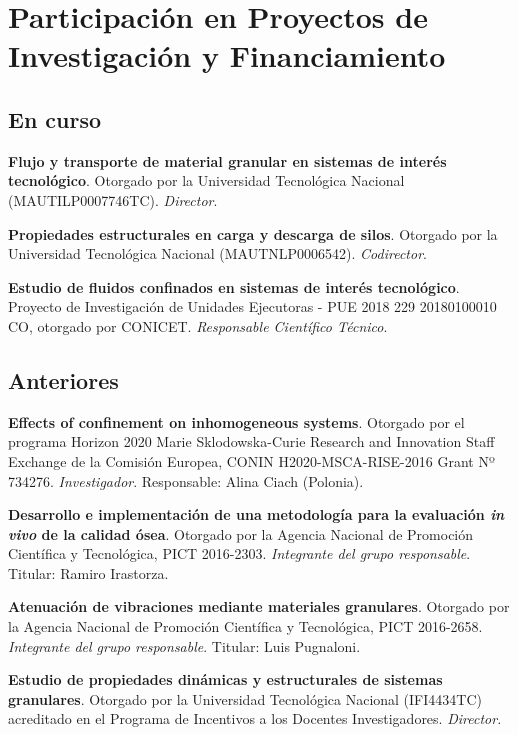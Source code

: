 \section{Participación en Proyectos de Investigación y Financiamiento}
\subsection{En curso}

 \textbf{Flujo y transporte de material granular en sistemas de interés tecnológico}. Otorgado por la Universidad Tecnológica Nacional (MAUTILP0007746TC). \textit{Director}.

 \textbf{Propiedades estructurales en carga y descarga de silos}. Otorgado por la Universidad Tecnológica Nacional (MAUTNLP0006542). \textit{Codirector}.

 \textbf{Estudio de fluidos confinados en sistemas de interés tecnológico}. Proyecto de Investigación de Unidades Ejecutoras - PUE 2018 229 20180100010 CO, otorgado por CONICET. \textit{Responsable Científico Técnico}.


\subsection{Anteriores}

 \textbf{Effects of confinement on inhomogeneous systems}. Otorgado por el programa Horizon 2020 Marie Sklodowska-Curie Research and Innovation Staff Exchange de la Comisión Europea, CONIN H2020-MSCA-RISE-2016 Grant Nº 734276. \textit{Investigador}. Responsable: Alina Ciach (Polonia).

 \textbf{Desarrollo e implementación de una metodología para la evaluación \textit{in vivo} de la calidad ósea}. Otorgado por la Agencia Nacional de Promoción Científica y Tecnológica, PICT 2016-2303. \textit{Integrante del grupo responsable}. Titular: Ramiro Irastorza.

 \textbf{Atenuación de vibraciones mediante materiales granulares}. Otorgado por la Agencia Nacional de Promoción Científica y Tecnológica, PICT 2016-2658. \textit{Integrante del grupo responsable}. Titular: Luis Pugnaloni.

 \textbf{Estudio de propiedades dinámicas y estructurales de sistemas granulares}. Otorgado por la Universidad Tecnológica Nacional (IFI4434TC) acreditado en el Programa de Incentivos a los Docentes Investigadores. \textit{Director.}

